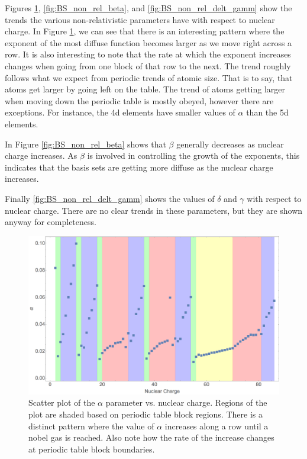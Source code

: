 Figures \ref{fig:BS_non_rel_alpha}, \ref{fig:BS_non_rel_beta}, and \ref{fig:BS_non_rel_delt_gamm} show the trends the various non-relativistic parameters have with respect to nuclear charge. In Figure  \ref{fig:BS_non_rel_alpha}, we can see that there is an interesting pattern where the exponent of the most diffuse function becomes larger as we move right across a row. It is also interesting to note that the rate at which the exponent increases changes when going from one block of that row to the next. The trend roughly follows what we expect from periodic trends of atomic size. That is to say, that atoms get larger by going left on the table. The trend of atoms getting larger when moving down the periodic table is mostly obeyed, however there are exceptions. For instance, the 4d elements have smaller values of $\alpha$ than the 5d elements.

In Figure \ref{fig:BS_non_rel_beta} shows that $\beta$ generally decreases as nuclear charge increases. As $\beta$ is involved in controlling the growth of the exponents, this indicates that the basis sets are getting more diffuse as the nuclear charge increases.

Finally \ref{fig:BS_non_rel_delt_gamm} shows the values of $\delta$ and $\gamma$ with respect to nuclear charge. There are no clear trends in these parameters, but they are shown anyway for completeness.

\begin{figure}
\center
\includegraphics[width=1\textwidth]{Figures/BS_non_rel_alpha.png}
\caption[Scatter plot of the $\alpha$ parameter vs. nuclear charge.]
{Scatter plot of the $\alpha$ parameter vs. nuclear charge. Regions of the plot are shaded based on periodic table block regions. There is a distinct pattern where the value of $\alpha$ increases along a row until a nobel gas is reached. Also note how the rate of the increase changes at periodic table block boundaries.}
\label{fig:BS_non_rel_alpha}
\end{figure}

